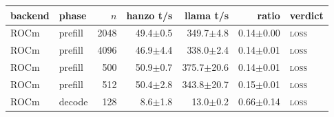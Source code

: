 \begin{tabular}{@{}llrrrrl@{}}
\toprule
backend & phase & $n$ & hanzo t/s & llama t/s & ratio & verdict \\
\midrule
ROCm & prefill & 2048 & 49.4$\pm$0.5 & 349.7$\pm$4.8 & 0.14$\pm$0.00 & \textsc{loss} \\
ROCm & prefill & 4096 & 46.9$\pm$4.4 & 338.0$\pm$2.4 & 0.14$\pm$0.01 & \textsc{loss} \\
ROCm & prefill & 500 & 50.9$\pm$0.7 & 375.7$\pm$20.6 & 0.14$\pm$0.01 & \textsc{loss} \\
ROCm & prefill & 512 & 50.4$\pm$2.8 & 343.8$\pm$20.7 & 0.15$\pm$0.01 & \textsc{loss} \\
ROCm & decode & 128 & 8.6$\pm$1.8 & 13.0$\pm$0.2 & 0.66$\pm$0.14 & \textsc{loss} \\
\bottomrule
\end{tabular}
